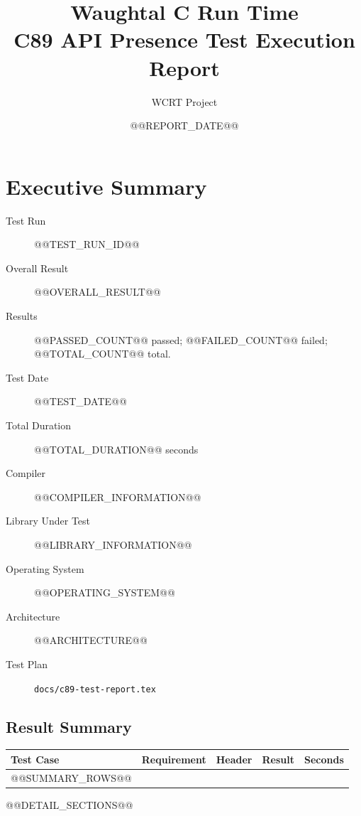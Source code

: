 \documentclass[letterpaper]{article}
\title{Waughtal C Run Time\\C89 API Presence Test Execution Report}
\author{WCRT Project}
\date{@@REPORT_DATE@@}
\begin{document}
\maketitle

\section*{Executive Summary}
\begin{description}
\item[Test Run] @@TEST_RUN_ID@@
\item[Overall Result] @@OVERALL_RESULT@@
\item[Results] @@PASSED_COUNT@@ passed; @@FAILED_COUNT@@ failed; @@TOTAL_COUNT@@ total.
\item[Test Date] @@TEST_DATE@@
\item[Total Duration] @@TOTAL_DURATION@@ seconds
\item[Compiler] @@COMPILER_INFORMATION@@
\item[Library Under Test] @@LIBRARY_INFORMATION@@
\item[Operating System] @@OPERATING_SYSTEM@@
\item[Architecture] @@ARCHITECTURE@@
\item[Test Plan] \texttt{docs/c89-test-report.tex}
\end{description}

\subsection*{Result Summary}
\begin{center}
\small
\begin{tabular}{llllr}
\textbf{Test Case} & \textbf{Requirement} & \textbf{Header} & \textbf{Result} & \textbf{Seconds} \\
\hline
@@SUMMARY_ROWS@@
\end{tabular}
\end{center}

\clearpage
\tableofcontents
\clearpage

@@DETAIL_SECTIONS@@
\end{document}
